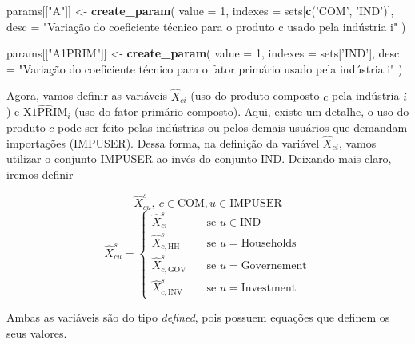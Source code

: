 \documentclass[12pt,twoside]{article}
\newenvironment{Shaded}{\begin{snugshade}}{\end{snugshade}}
\newcommand{\DataTypeTok}[1]{\textcolor[rgb]{0.13,0.29,0.53}{#1}}
\newcommand{\DecValTok}[1]{\textcolor[rgb]{0.00,0.00,0.81}{#1}}
\newcommand{\KeywordTok}[1]{\textcolor[rgb]{0.13,0.29,0.53}{\textbf{#1}}}
\newcommand{\NormalTok}[1]{#1}
\newcommand{\StringTok}[1]{\textcolor[rgb]{0.31,0.60,0.02}{#1}}
\let\oldShaded\Shaded
\let\endoldShaded\endShaded
\renewenvironment{Shaded}{\footnotesize\oldShaded}{\endoldShaded}
\begin{document}
\begin{Shaded}
\begin{Highlighting}[]
\NormalTok{params[[}\StringTok{"A"}\NormalTok{]] <-}\StringTok{ }\KeywordTok{create_param}\NormalTok{(}
  \DataTypeTok{value =} \DecValTok{1}\NormalTok{,}
  \DataTypeTok{indexes =}\NormalTok{ sets[}\KeywordTok{c}\NormalTok{(}\StringTok{'COM'}\NormalTok{, }\StringTok{'IND'}\NormalTok{)],}
  \DataTypeTok{desc =} \StringTok{"Variação do coeficiente técnico para o produto c usado pela indústria i"}
\NormalTok{)}

\NormalTok{params[[}\StringTok{"A1PRIM"}\NormalTok{]] <-}\StringTok{ }\KeywordTok{create_param}\NormalTok{(}
  \DataTypeTok{value =} \DecValTok{1}\NormalTok{,}
  \DataTypeTok{indexes =}\NormalTok{ sets[}\StringTok{'IND'}\NormalTok{],}
  \DataTypeTok{desc =} \StringTok{"Variação do coeficiente técnico para o fator primário usado pela indústria i"}
\NormalTok{)}
\end{Highlighting}
\end{Shaded}

Agora, vamos definir as variáveis \(\hat{X}_{ci}\) (uso do produto
composto \(c\) pela indústria \(i\)) e \(\hat{\text{X1PRIM}}_i\) (uso do
fator primário composto). Aqui, existe um detalhe, o uso do produto
\(c\) pode ser feito pelas indústrias ou pelos demais usuários que
demandam importações (IMPUSER). Dessa forma, na definição da variável
\(\hat{X}_{ci}\), vamos utilizar o conjunto IMPUSER ao invés do conjunto
IND. Deixando mais claro, iremos definir

\[ \hat{X}^s_{cu},~ c \in \text{COM}, u \in \text{IMPUSER} \]
\[ \hat{X}^s_{cu} =
\begin{cases}
\hat{X}^s_{ci}       & \quad \text{se } u \in \text{IND}\\
\hat{X}^s_{c,\text{HH}}       & \quad \text{se } u = \text{Households}\\
\hat{X}^s_{c,\text{GOV}}       & \quad \text{se } u = \text{Governement}\\
\hat{X}^s_{c,\text{INV}}       & \quad \text{se } u = \text{Investment}
\end{cases}
\]

Ambas as variáveis são do tipo \emph{defined}, pois possuem equações que
definem os seus valores.
\end{document}
